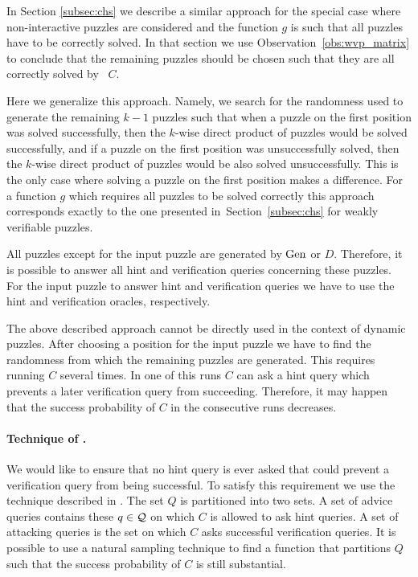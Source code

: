 In Section \ref{subsec:chs} we describe a similar approach for the special case where
non-interactive puzzles are considered and the function $g$ is such that all puzzles have to be correctly solved.
In that section we use Observation~\ref{obs:wvp_matrix} to conclude that the remaining puzzles should be chosen such that they
are all correctly solved by~ $C$.

Here we generalize this approach. Namely, we search for the randomness used to generate the remaining $k\!-\!1$ puzzles
such that when a puzzle on the first position was solved successfully, then the $k$-wise direct product of puzzles would be solved successfully,
and if a puzzle on the first position was unsuccessfully solved, then the $k$-wise direct product of puzzles would be also solved unsuccessfully.
This is the only case where solving a puzzle on the first position makes a difference.
For a function $g$ which requires all puzzles to be solved correctly
this approach corresponds exactly to the one presented in~Section~\ref{subsec:chs} for weakly verifiable puzzles.

All puzzles except for the input puzzle are generated by $\operatorname{\text{Gen}}$ or $D$.
Therefore, it is possible to answer all hint and verification queries concerning these puzzles.
For the input puzzle to answer hint and verification queries we have to use the hint and verification oracles, respectively.

The above described approach cannot be directly used in the context of dynamic puzzles.
After choosing a position for the input puzzle we have to find the randomness from which the remaining puzzles are generated.
This requires running $C$ several times. In one of this runs $C$ can ask a hint query which prevents a later verification query from succeeding.
Therefore, it may happen that the success probability of $C$ in the consecutive runs decreases.

\paragraph{Technique of \cite{dodis2009security}.}
We would like to ensure that no hint query is ever asked that could prevent a verification query from being successful.
To satisfy this requirement we use the technique described in \cite{dodis2009security}.
The set $Q$ is partitioned into two sets. A set of advice queries contains these $q \in \mathcal{Q}$ on which
$C$ is allowed to ask hint queries. A set of attacking queries is the set on which $C$ asks successful verification queries.
It is possible to use a natural sampling technique to find a function that partitions $Q$ such that
the success probability of $C$ is still substantial.

